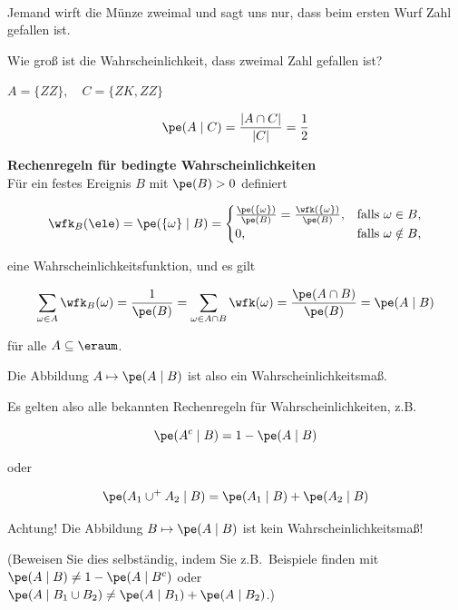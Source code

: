 \begin{fr}
     \\
    Jemand wirft die Münze zweimal und sagt uns nur, dass beim ersten Wurf Zahl gefallen ist.

    Wie groß ist die Wahrscheinlichkeit, dass zweimal Zahl gefallen ist?

    $A = \{ZZ\}, \quad C = \{ZK, ZZ\}$

    \[
        \pe(A \mid C) = \frac{|A \cap C|}{|C|} = \frac{1}{2}
    \]
\end{fr}

\begin{reg}
    \textbf{Rechenregeln für bedingte Wahrscheinlichkeiten }   \\
    Für ein festes Ereignis $B$ mit $\pe(B) > 0$ definiert

    \[
        \wfk_B(\ele) = \pe(\{\omega\} \mid B) =
        \begin{cases}
            \frac{\pe(\{\omega\})}{\pe(B)} = \frac{\wfk(\{\omega\})}{\pe(B)}, & \text{falls } \omega \in B, \\
            0, & \text{falls } \omega \notin B,
        \end{cases}
    \]

    eine Wahrscheinlichkeitsfunktion, und es gilt

    \[
        \sum_{\omega \in A}\wfk_B(\omega)
        =
        \frac{1}{\pe(B)}
        =
        \sum_{\omega \in A \cap B} \wfk(\omega)
        =
        \frac{\pe(A \cap B)}{\pe(B)}
        =
        \pe(A \mid B)
    \]

    für alle $A \subseteq \eraum$.

    Die Abbildung $A \mapsto \pe(A \mid B)$ ist also ein Wahrscheinlichkeitsmaß.

    Es gelten also alle bekannten Rechenregeln für Wahrscheinlichkeiten, z.B\@.

    \[
        \pe(A^c \mid B) = 1 - \pe(A \mid B)
    \]

    oder

    \[
        \pe(A_1 \cup^+ A_2 \mid B) = \pe(A_1 \mid B) + \pe(A_2 \mid B)
    \]


    Achtung!
    Die Abbildung $B \mapsto \pe(A \mid B)$ ist kein Wahrscheinlichkeitsmaß!

    (Beweisen Sie dies selbständig, indem Sie z.B.\ Beispiele finden mit
    $\pe(A \mid B) \neq 1 - \pe(A \mid B^c)$ oder
    $\pe(A\mid B_1 \cup B_2) \neq \pe(A \mid B_1) + \pe(A \mid B_2)$.)
\end{reg}

